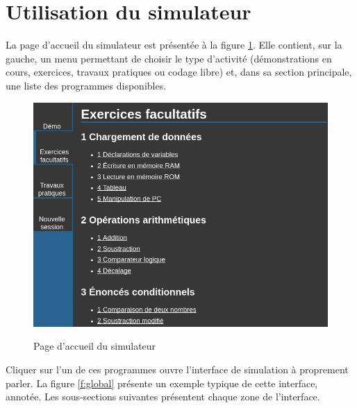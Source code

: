 \documentclass{tufte-handout}
\begin{document}
\section{Utilisation du simulateur}

La page d'accueil du simulateur est présentée à la figure \ref{f:accueil}. Elle contient, sur la gauche, un menu permettant de choisir le type d'activité (démonstrations en cours, exercices, travaux pratiques ou codage libre) et, dans sa section principale, une liste des programmes disponibles.

\begin{figure}
\raggedleft
\includegraphics[width=0.8\linewidth]{pics/accueil.png}
\label{f:accueil}
\caption{Page d'accueil du simulateur}
\end{figure}

Cliquer sur l'un de ces programmes ouvre l'interface de simulation à proprement parler. La figure \ref{f:global} présente un exemple typique de cette interface, annotée. Les sous-sections suivantes présentent chaque zone de l'interface.
\end{document}

